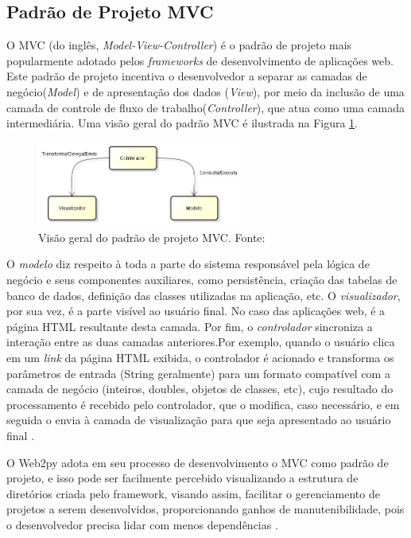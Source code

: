\subsection{Padrão de Projeto MVC}

O MVC (do inglês, \emph{Model-View-Controller}) é o padrão de projeto mais popularmente adotado pelos \emph{frameworks} de desenvolvimento de aplicações web. Este padrão de projeto incentiva o desenvolvedor a separar as camadas de negócio(\emph{Model}) e de apresentação dos dados (\emph{View}), por meio da inclusão de uma camada de controle de fluxo de trabalho(\emph{Controller}), que atua como uma camada intermediária\cite{Pierro:Livro}. Uma visão geral do padrão MVC é ilustrada na Figura \ref{fig:padraomvc}.

\begin{figure}[H]
	\centering
	\includegraphics[width=0.6\textwidth]{./img/mvc.png}
	\caption{Visão geral do padrão de projeto MVC. Fonte: \cite{Weissman:MVC} \label{fig:padraomvc}}
\end{figure}

O \textit{modelo} diz respeito à toda a parte do sistema responsável pela lógica de negócio e seus componentes auxiliares, como persistência, criação das tabelas de banco de dados, definição das classes utilizadas na aplicação, etc. O \textit{visualizador}, por sua vez, é a parte visível ao usuário final. No caso das aplicações web, é a página HTML resultante desta camada. Por fim, o \emph{controlador} sincroniza a interação entre as duas camadas anteriores.Por exemplo, quando o usuário clica em um \textit{link} da página HTML exibida, o controlador é acionado e transforma os parâmetros de entrada (String geralmente) para um formato compatível com a camada de negócio (inteiros, doubles, objetos de classes, etc), cujo resultado do  processamento é recebido pelo controlador, que o modifica, caso necessário, e em seguida o envia à camada de visualização para que seja apresentado ao usuário final \cite{Weissman:MVC}.

O Web2py adota em seu processo de desenvolvimento o MVC como padrão de projeto, e isso pode ser facilmente percebido visualizando a estrutura de diretórios criada pelo framework, visando assim, facilitar o gerenciamento de projetos a serem desenvolvidos, proporcionando ganhos de manutenibilidade, pois o desenvolvedor precisa lidar com menos dependências \cite{Pierro:Livro}.
